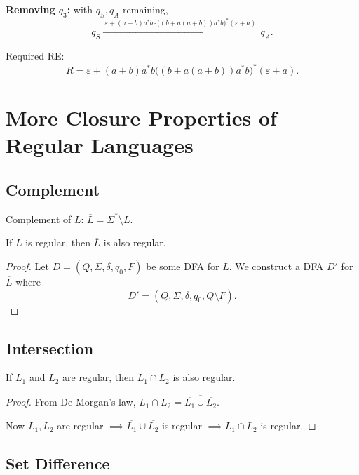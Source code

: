 \medskip
\noindent\textbf{Removing $q_3$:} with $q_S, q_A$ remaining,
\[
q_S \xrightarrow{\ \varepsilon + (a+b)a^*b \cdot \big((b+a(a+b))a^*b\big)^* (\varepsilon + a)\ } q_A.
\]

\noindent Required RE:
\[
R = \varepsilon + (a+b)a^*b\big((b+a(a+b))a^*b\big)^*(\varepsilon + a).
\]

\section{More Closure Properties of Regular Languages}

\subsection*{Complement}

Complement of $L$: \quad $\overline{L} = \Sigma^* \setminus L$.

\begin{blackbox}
\begin{proposition}
If $L$ is regular, then $\overline{L}$ is also regular.
\end{proposition}
\end{blackbox}

\begin{proof}
Let $D = (Q, \Sigma, \delta, q_0, F)$ be some DFA for $L$. We construct a DFA $D'$ for $\overline{L}$ where
\[
D' = (Q, \Sigma, \delta, q_0, Q \setminus F).
\]
\end{proof}

\subsection*{Intersection}

\begin{blackbox}
\begin{proposition}
If $L_1$ and $L_2$ are regular, then $L_1 \cap L_2$ is also regular.
\end{proposition}
\end{blackbox}

\begin{proof}
From De Morgan's law, $L_1 \cap L_2 = \overline{\overline{L_1} \cup \overline{L_2}}$.

Now $L_1, L_2$ are regular $\implies \overline{L_1} \cup \overline{L_2}$ is regular $\implies L_1 \cap L_2$ is regular.
\end{proof}

\subsection*{Set Difference}


